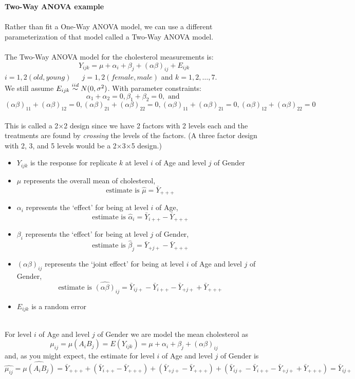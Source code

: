\newpage
\textbf{Two-Way ANOVA example}\\~\\
Rather than fit a One-Way ANOVA model, we can use a different parameterization of that model called a Two-Way ANOVA model.\\~\\
The Two-Way ANOVA model for the cholesterol measurements is:
$$Y_{ijk} = \mu + \alpha_i + \beta_j + (\alpha \beta)_{ij} + E_{ijk}$$
$i=1,2 (old,young)$~~~$j=1,2 (female, male)$ and $k=1,2,\ldots,7$.\\
We still assume $E_{ijk} \stackrel{iid}{\sim} N(0,\sigma^2)$.  With parameter constraints:
$$\alpha_1+\alpha_2=0, \beta_1+\beta_2=0,\mbox{ and }$$
$$(\alpha\beta)_{11}+(\alpha\beta)_{12}=0,(\alpha\beta)_{21}+(\alpha\beta)_{22}=0,(\alpha\beta)_{11}+(\alpha\beta)_{21}=0,(\alpha\beta)_{12}+(\alpha\beta)_{22}=0$$~\\
This is called a 2$\times$2 design since we have 2 factors with 2 levels each and the treatments are found by \textit{crossing} the levels of the factors.  (A three factor design with 2, 3, and 5 levels would be a 2$\times$3$\times$5 design.)
\begin{itemize}
\item $Y_{ijk}$ is the response for replicate $k$ at level $i$ of Age and level $j$ of Gender
\item $\mu$ represents the overall mean of cholesterol, 
$$\mbox{estimate is }\hat{\mu}=\bar{Y}_{+++}$$
\item $\alpha_i$ represents the `effect' for being at level $i$ of Age, 
$$\mbox{estimate is }\hat{\alpha}_i=\bar{Y}_{i++}-\bar{Y}_{+++}$$
\item $\beta_i$ represents the `effect' for being at level $j$ of Gender, 
$$\mbox{estimate is }\hat{\beta}_j=\bar{Y}_{+j+}-\bar{Y}_{+++}$$
\item $(\alpha\beta)_{ij}$ represents the `joint effect' for being at level $i$ of Age and level $j$ of Gender, 
$$\mbox{estimate is }\hat{(\alpha\beta)}_{ij}=\bar{Y}_{ij+}-\bar{Y}_{i++}-\bar{Y}_{+j+}+\bar{Y}_{+++}$$
\item $E_{ijk}$ is a random error\\~\\
\end{itemize}
For level $i$ of Age and level $j$ of Gender we are model the mean cholesterol as
$$\mu_{ij}=\mu(A_{i}B_{j})=E(Y_{ijk})=\mu+\alpha_i+\beta_j+(\alpha\beta)_{ij}$$
and, as you might expect, the estimate for level $i$ of Age and level $j$ of Gender is
$$\hat{\mu_{ij}}=\widehat{\mu(A_{i}B_{j})}=\bar{Y}_{+++}+(\bar{Y}_{i++}-\bar{Y}_{+++})+(\bar{Y}_{+j+}-\bar{Y}_{+++})+(\bar{Y}_{ij+}-\bar{Y}_{i++}-\bar{Y}_{+j+}+\bar{Y}_{+++}) =\bar{Y}_{ij+}$$

